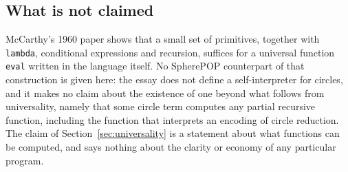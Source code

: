\subsection{What is not claimed}

McCarthy's 1960 paper \cite{mccarthy} shows that a small set of primitives, together with \texttt{lambda}, conditional expressions and recursion, suffices for a universal function \texttt{eval} written in the language itself. No SpherePOP counterpart of that construction is given here: the essay does not define a self-interpreter for circles, and it makes no claim about the existence of one beyond what follows from universality, namely that some circle term computes any partial recursive function, including the function that interprets an encoding of circle reduction. The claim of Section~\ref{sec:universality} is a statement about what functions can be computed, and says nothing about the clarity or economy of any particular program.
